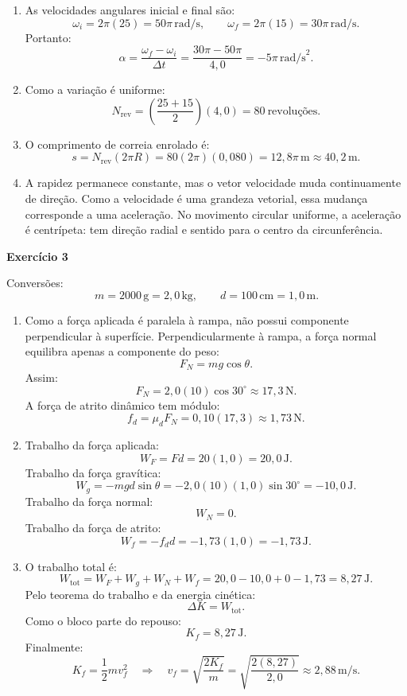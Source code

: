 \documentclass[12pt]{article}
\begin{document}
	\begin{enumerate}[label=\textbf{\alph*)}]
		\item As velocidades angulares inicial e final são:
		\[
		\omega_i=2\pi(25)=50\pi\,\text{rad/s},
		\qquad
		\omega_f=2\pi(15)=30\pi\,\text{rad/s}.
		\]
		Portanto:
		\[
		\alpha=\frac{\omega_f-\omega_i}{\Delta t}
		=\frac{30\pi-50\pi}{4,0}
		=-5\pi\,\text{rad/s}^2.
		\]
		
		\item Como a variação é uniforme:
		\[
		N_{\text{rev}}
		=\left(\frac{25+15}{2}\right)(4,0)
		=80\ \text{revoluções}.
		\]
		
		\item O comprimento de correia enrolado é:
		\[
		s=N_{\text{rev}}(2\pi R)
		=80(2\pi)(0,080)
		=12,8\pi\,\text{m}
		\approx 40,2\,\text{m}.
		\]
		
		\item A rapidez permanece constante, mas o vetor velocidade muda continuamente de
		direção. Como a velocidade é uma grandeza vetorial, essa mudança corresponde a uma
		aceleração. No movimento circular uniforme, a aceleração é centrípeta: tem direção
		radial e sentido para o centro da circunferência.
	\end{enumerate}
	
	\newpage
	
	\textbf{Exercício 3}
	
	Conversões:
	\[
	m=2000\,\text{g}=2,0\,\text{kg},
	\qquad
	d=100\,\text{cm}=1,0\,\text{m}.
	\]
	
	\begin{enumerate}[label=\textbf{\alph*)}]
		\item Como a força aplicada é paralela à rampa, não possui componente perpendicular
		à superfície. Perpendicularmente à rampa, a força normal equilibra apenas a componente
		do peso:
		\[
		F_N=mg\cos\theta.
		\]
		Assim:
		\[
		F_N=2,0(10)\cos 30^\circ
		\approx 17,3\,\text{N}.
		\]
		A força de atrito dinâmico tem módulo:
		\[
		f_d=\mu_dF_N=0,10(17,3)\approx1,73\,\text{N}.
		\]
		
		\item Trabalho da força aplicada:
		\[
		W_F=Fd
		=20(1,0)
		=20,0\,\text{J}.
		\]
		Trabalho da força gravítica:
		\[
		W_g=-mgd\sin\theta
		=-2,0(10)(1,0)\sin30^\circ
		=-10,0\,\text{J}.
		\]
		Trabalho da força normal:
		\[
		W_N=0.
		\]
		Trabalho da força de atrito:
		\[
		W_f=-f_dd
		=-1,73(1,0)
		=-1,73\,\text{J}.
		\]
		
		\item O trabalho total é:
		\[
		W_{\text{tot}}
		=W_F+W_g+W_N+W_f
		=20,0-10,0+0-1,73
		=8,27\,\text{J}.
		\]
		Pelo teorema do trabalho e da energia cinética:
		\[
		\Delta K=W_{\text{tot}}.
		\]
		Como o bloco parte do repouso:
		\[
		K_f=8,27\,\text{J}.
		\]
		Finalmente:
		\[
		K_f=\frac12mv_f^2
		\quad\Longrightarrow\quad
		v_f=\sqrt{\frac{2K_f}{m}}
		=\sqrt{\frac{2(8,27)}{2,0}}
		\approx2,88\,\text{m/s}.
		\]
	\end{enumerate}
	
\end{document}

